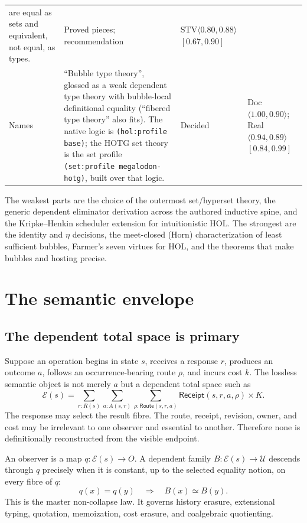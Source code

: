 \documentclass[11pt]{article}
\theoremstyle{definition}
\theoremstyle{remark}
\newcommand{\code}[1]{\texttt{#1}}
\begin{document}
{\begin{longtable}{>{\raggedright\arraybackslash}p{2.3cm}
  >{\raggedright\arraybackslash}p{5.9cm}
  >{\raggedright\arraybackslash}p{2.3cm}
  >{\raggedright\arraybackslash}p{2.5cm}}
  are equal as sets and equivalent, not equal, as types. & Proved pieces;
  recommendation & $\mathrm{STV}\langle 0.80, 0.88\rangle$ $[0.67,0.90]$\\
Names & ``Bubble type theory'', glossed as a weak dependent type theory with
  bubble-local definitional equality (``fibered type theory'' also fits). The
  native logic is \code{(hol:profile base)}; the HOTG set theory is the set
  profile \code{(set:profile megalodon-hotg)}, built over that logic. & Decided
  & Doc $\langle 1.00, 0.90\rangle$; Real $\langle 0.94, 0.89\rangle$ $[0.84,0.99]$\\
\bottomrule
\end{longtable}
}

The weakest parts are the choice of the outermost set/hyperset theory, the
generic dependent eliminator derivation across the authored inductive spine, and
the Kripke--Henkin scheduler extension for intuitionistic HOL. The strongest are
the identity and $\eta$ decisions, the meet-closed (Horn) characterization of
least sufficient bubbles, Farmer's seven virtues for HOL, and the theorems that
make bubbles and hosting precise.

\section{The semantic envelope}

\subsection{The dependent total space is primary}

Suppose an operation begins in state $s$, receives a response $r$, produces an
outcome $a$, follows an occurrence-bearing route $\rho$, and incurs cost $k$.
The lossless semantic object is not merely $a$ but a dependent total space such
as
\[
  \mathcal{E}(s)
  = \sum_{r:R(s)}\sum_{a:A(s,r)}
    \sum_{\rho:\mathsf{Route}(s,r,a)} \mathsf{Receipt}(s,r,a,\rho)
      \times K.
\]
The response may select the result fibre.  The route, receipt, revision, owner,
and cost may be irrelevant to one observer and essential to another.  Therefore
none is definitionally reconstructed from the visible endpoint.

An observer is a map $q:\mathcal{E}(s)\to O$.  A dependent family
$B:\mathcal{E}(s)\to\mathcal{U}$ descends through $q$ precisely when it is
constant, up to the selected equality notion, on every fibre of $q$:
\[
  q(x)=q(y) \quad\Longrightarrow\quad B(x)\simeq B(y).
\]
This is the master non-collapse law.  It governs history erasure, extensional
typing, quotation, memoization, cost erasure, and coalgebraic quotienting.
\end{document}
